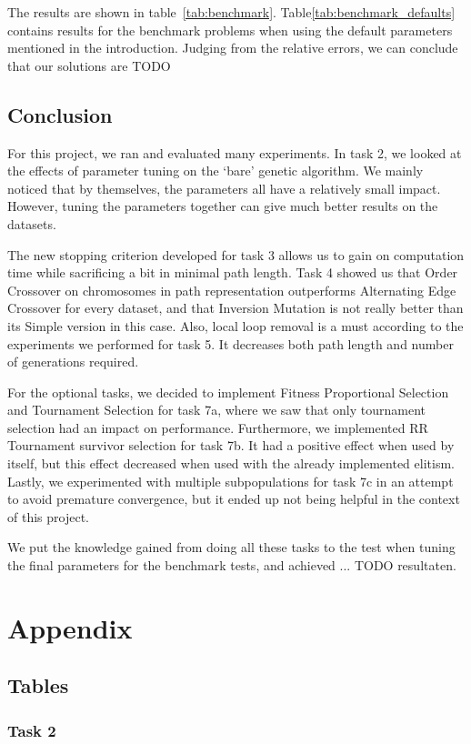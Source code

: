 \documentclass{report}
\newcommand{\mychapter}[2]{
    \setcounter{chapter}{#1}
    \setcounter{section}{0}
    \chapter*{#2}
    \addcontentsline{toc}{chapter}{#2}
}
\begin{document}
The results are shown in table~\ref{tab:benchmark}. Table\ref{tab:benchmark_defaults} contains results for the benchmark problems when using the default parameters mentioned in the introduction. Judging from the relative errors, we can conclude that our solutions are TODO
%
%


\section{Conclusion}

For this project, we ran and evaluated many experiments. In task 2, we looked at the effects of parameter tuning on the `bare' genetic algorithm. We mainly noticed that by themselves, the parameters all have a relatively small impact. However, tuning the parameters together can give much better results on the datasets.

The new stopping criterion developed for task 3 allows us to gain on computation time while sacrificing a bit in minimal path length. Task 4 showed us that Order Crossover on chromosomes in path representation outperforms Alternating Edge Crossover for every dataset, and that Inversion Mutation is not really better than its Simple version in this case. Also, local loop removal is a must according to the experiments we performed for task 5. It decreases both path length and number of generations required.

For the optional tasks, we decided to implement Fitness Proportional Selection and Tournament Selection for task 7a, where we saw that only tournament selection had an impact on performance. Furthermore, we implemented RR Tournament survivor selection for task 7b. It had a positive effect when used by itself, but this effect decreased when used with the already implemented elitism. Lastly, we experimented with multiple subpopulations for task 7c in an attempt to avoid premature convergence, but it ended up not being helpful in the context of this project.

We put the knowledge gained from doing all these tasks to the test when tuning the final parameters for the benchmark tests, and achieved ... TODO resultaten.

\mychapter{4}{Appendix}
\section{Tables}
\subsection{Task 2}
\label{app:task2}





\end{document}
